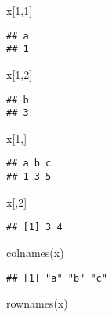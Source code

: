 \documentclass[
]{book}
\newenvironment{Shaded}{\begin{snugshade}}{\end{snugshade}}
\newcommand{\DecValTok}[1]{\textcolor[rgb]{0.00,0.00,0.81}{#1}}
\newcommand{\FunctionTok}[1]{\textcolor[rgb]{0.00,0.00,0.00}{#1}}
\newcommand{\NormalTok}[1]{#1}
\begin{document}
\begin{Shaded}
\begin{Highlighting}[]
\NormalTok{x[}\DecValTok{1}\NormalTok{,}\DecValTok{1}\NormalTok{]}
\end{Highlighting}
\end{Shaded}

\begin{verbatim}
## a 
## 1
\end{verbatim}

\begin{Shaded}
\begin{Highlighting}[]
\NormalTok{x[}\DecValTok{1}\NormalTok{,}\DecValTok{2}\NormalTok{]}
\end{Highlighting}
\end{Shaded}

\begin{verbatim}
## b 
## 3
\end{verbatim}

\begin{Shaded}
\begin{Highlighting}[]
\NormalTok{x[}\DecValTok{1}\NormalTok{,]}
\end{Highlighting}
\end{Shaded}

\begin{verbatim}
## a b c 
## 1 3 5
\end{verbatim}

\begin{Shaded}
\begin{Highlighting}[]
\NormalTok{x[,}\DecValTok{2}\NormalTok{]}
\end{Highlighting}
\end{Shaded}

\begin{verbatim}
## [1] 3 4
\end{verbatim}

\begin{Shaded}
\begin{Highlighting}[]
\FunctionTok{colnames}\NormalTok{(x)}
\end{Highlighting}
\end{Shaded}

\begin{verbatim}
## [1] "a" "b" "c"
\end{verbatim}

\begin{Shaded}
\begin{Highlighting}[]
\FunctionTok{rownames}\NormalTok{(x)}
\end{Highlighting}
\end{Shaded}
\end{document}
